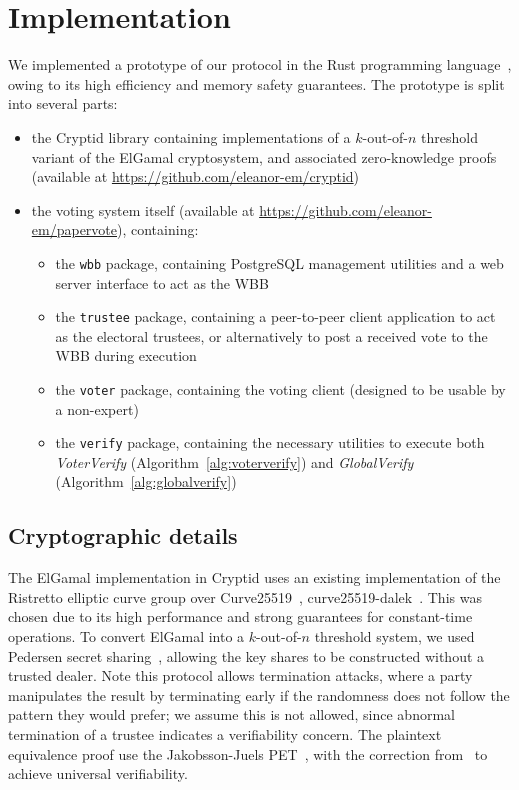 \documentclass[12pt,a4paper]{article}
\theoremstyle{definition}
\begin{document}
\section{Implementation}\label{sec-impl}
We implemented a prototype of our protocol in the Rust programming language~\cite{klabnik2019rust}, owing to its high efficiency and memory safety guarantees. The prototype is split into several parts:
\begin{itemize}
    \item the Cryptid library containing implementations of a $k$-out-of-$n$ threshold variant of the ElGamal cryptosystem, and associated zero-knowledge proofs (available at \url{https://github.com/eleanor-em/cryptid})
    \item the voting system itself (available at \url{https://github.com/eleanor-em/papervote}), containing:
        \begin{itemize}
            \item the \texttt{wbb} package, containing PostgreSQL management utilities and a web server interface to act as the WBB
            \item the \texttt{trustee} package, containing a peer-to-peer client application to act as the electoral trustees, or alternatively to post a received vote to the WBB during execution
            \item the \texttt{voter} package, containing the voting client (designed to be usable by a non-expert)
            \item the \texttt{verify} package, containing the necessary utilities to execute both \textit{VoterVerify} (Algorithm~\ref{alg:voterverify}) and \textit{GlobalVerify} (Algorithm~\ref{alg:globalverify})
        \end{itemize}
\end{itemize}

\subsection{Cryptographic details}\label{sec:prototype-crypto}
The ElGamal implementation in Cryptid uses an existing implementation of the Ristretto elliptic curve group over Curve25519~\cite{hamburg2015decaf}, curve25519-dalek~\cite{curve25519dalek}. This was chosen due to its high performance and strong guarantees for constant-time operations. To convert ElGamal into a $k$-out-of-$n$ threshold system, we used Pedersen secret sharing~\cite{pedersen1991threshold}, allowing the key shares to be constructed without a trusted dealer. Note this protocol allows termination attacks, where a party manipulates the result by terminating early if the randomness does not follow the pattern they would prefer; we assume this is not allowed, since abnormal termination of a trustee indicates a verifiability concern. The plaintext equivalence proof use the Jakobsson-Juels PET~\cite{jakobsson2000mix}, with the correction from~\cite{mcmurtry2020test} to achieve universal verifiability.
\end{document}
